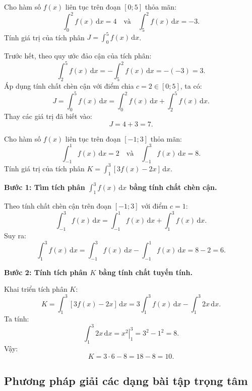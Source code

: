 \documentclass[12pt]{article}
\begin{document}
	\begin{vidu}
		Cho hàm số $f(x)$ liên tục trên đoạn $[0; 5]$ thỏa mãn:
		\[
		\int_0^2 f(x)\,\mathrm{d}x = 4 \quad \text{và} \quad \int_5^2 f(x)\,\mathrm{d}x = -3.
		\]
		Tính giá trị của tích phân $J = \displaystyle \int_0^5 f(x)\,\mathrm{d}x$.
	\end{vidu}
	\begin{loigiai}
		Trước hết, theo quy ước đảo cận của tích phân:
		\[
		\int_2^5 f(x)\,\mathrm{d}x = -\int_5^2 f(x)\,\mathrm{d}x = -(-3) = 3.
		\]
		Áp dụng tính chất chèn cận với điểm chia $c = 2 \in [0; 5]$, ta có:
		\[
		J = \int_0^5 f(x)\,\mathrm{d}x = \int_0^2 f(x)\,\mathrm{d}x + \int_2^5 f(x)\,\mathrm{d}x.
		\]
		Thay các giá trị đã biết vào:
		\[
		J = 4 + 3 = 7.
		\]
	\end{loigiai}
	
	\begin{vidu}
		Cho hàm số $f(x)$ liên tục trên đoạn $[-1; 3]$ thỏa mãn:
		\[
		\int_{-1}^1 f(x)\,\mathrm{d}x = 2 \quad \text{và} \quad \int_{-1}^3 f(x)\,\mathrm{d}x = 8.
		\]
		Tính giá trị của tích phân $K = \displaystyle \int_1^3 [3f(x) - 2x]\,\mathrm{d}x$.
	\end{vidu}
	\begin{loigiai}
		\textbf{Bước 1: Tìm tích phân $\displaystyle \int_1^3 f(x)\,\mathrm{d}x$ bằng tính chất chèn cận.}
		
		Theo tính chất chèn cận trên đoạn $[-1; 3]$ với điểm $c = 1$:
		\[
		\int_{-1}^3 f(x)\,\mathrm{d}x = \int_{-1}^1 f(x)\,\mathrm{d}x + \int_1^3 f(x)\,\mathrm{d}x.
		\]
		Suy ra:
		\[
		\int_1^3 f(x)\,\mathrm{d}x = \int_{-1}^3 f(x)\,\mathrm{d}x - \int_{-1}^1 f(x)\,\mathrm{d}x = 8 - 2 = 6.
		\]
		
		\textbf{Bước 2: Tính tích phân $K$ bằng tính chất tuyến tính.}
		
		Khai triển tích phân $K$:
		\[
		K = \int_1^3 [3f(x) - 2x]\,\mathrm{d}x = 3 \int_1^3 f(x)\,\mathrm{d}x - \int_1^3 2x\,\mathrm{d}x.
		\]
		Ta tính:
		\[
		\int_1^3 2x\,\mathrm{d}x = \left. x^2 \right|_1^3 = 3^2 - 1^2 = 8.
		\]
		Vậy:
		\[
		K = 3 \cdot 6 - 8 = 18 - 8 = 10.
		\]
	\end{loigiai}
	
	\subsection{Phương pháp giải các dạng bài tập trọng tâm}
	
\end{document}
